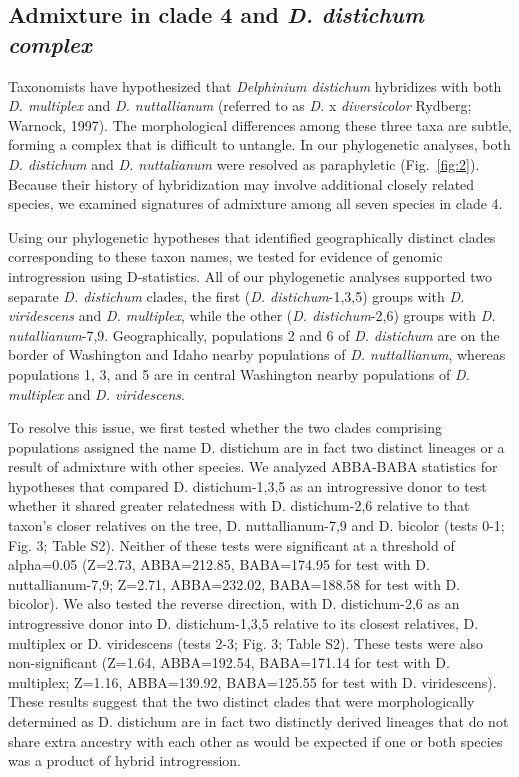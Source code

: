 \documentclass[11pt]{article}
\begin{document}
\subsection{Admixture in clade 4 and \emph{D. distichum complex}}
Taxonomists have hypothesized that \emph{Delphinium distichum} hybridizes with both 
\emph{D. multiplex} and \emph{D. nuttallianum} 
(referred to as \emph{D.} x \emph{diversicolor} Rydberg; Warnock, 1997).
% 
The morphological differences among these three taxa are subtle, forming a complex that 
is difficult to untangle. 
% 
In our phylogenetic analyses, both \emph{D. distichum} and \emph{D. nuttalianum} were
resolved as paraphyletic (Fig.~\ref{fig:2}). Because their history of hybridization
may involve additional closely related species, we examined signatures of admixture
among all seven species in clade 4. 
% 



Using our phylogenetic hypotheses that identified geographically distinct clades corresponding
to these taxon names, we tested for evidence of genomic introgression using D-statistics. 
All of our phylogenetic analyses supported two separate 
\emph{D. distichum} clades, the first (\emph{D. distichum}-1,3,5) groups with 
\emph{D. viridescens} and \emph{D. multiplex}, while the other 
(\emph{D. distichum}-2,6) groups with \emph{D. nutallianum}-7,9. 
Geographically, populations 2 and 6 of \emph{D. distichum} are on the border of 
Washington and Idaho nearby populations of \emph{D. nuttallianum}, whereas 
populations 1, 3, and 5 are in central Washington nearby populations of 
\emph{D. multiplex} and \emph{D. viridescens}. 


To resolve this issue, we first tested whether the two clades comprising populations assigned the name D. distichum are in fact two distinct lineages or a result of admixture with other species. We analyzed ABBA-BABA statistics for hypotheses that compared D. distichum-1,3,5 as an introgressive donor to test whether it shared greater relatedness with D. distichum-2,6 relative to that taxon’s closer relatives on the tree, D. nuttallianum-7,9 and D. bicolor (tests 0-1; Fig. 3; Table S2). Neither of these tests were significant at a threshold of alpha=0.05 (Z=2.73, ABBA=212.85, BABA=174.95 for test with D. nuttallianum-7,9; Z=2.71, ABBA=232.02, BABA=188.58 for test with D. bicolor). We also tested the reverse direction, with D. distichum-2,6 as an introgressive donor into D. distichum-1,3,5 relative to its closest relatives, D. multiplex or D. viridescens (tests 2-3; Fig. 3; Table S2). These tests were also non-significant (Z=1.64, ABBA=192.54, BABA=171.14 for test with D. multiplex; Z=1.16, ABBA=139.92, BABA=125.55 for test with D. viridescens). These results suggest that the two distinct clades that were morphologically determined as D. distichum are in fact two distinctly derived lineages that do not share extra ancestry with each other as would be expected if one or both species was a product of hybrid introgression.
\end{document}
